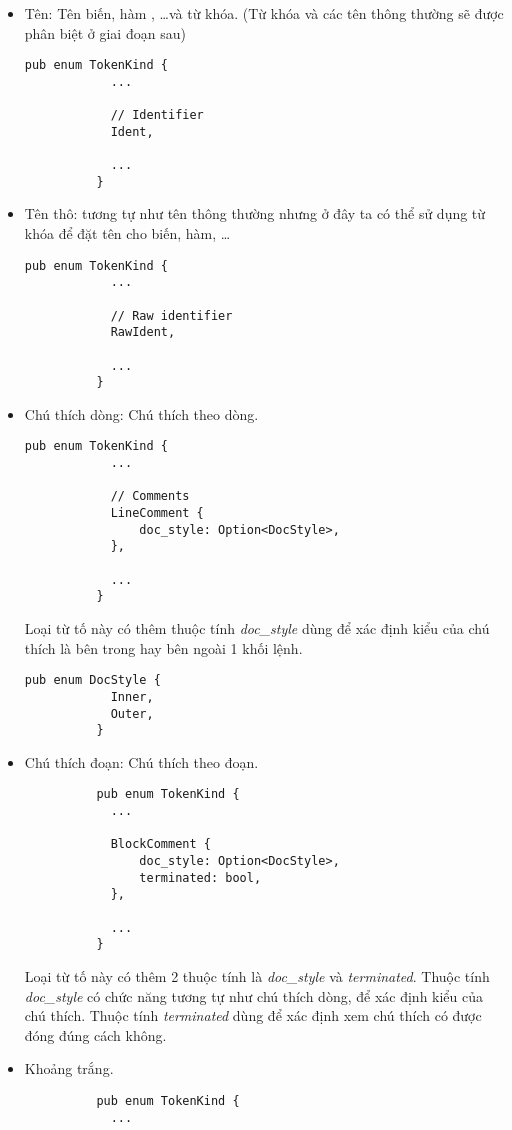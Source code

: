 \begin{itemize}
\begin{itemize}
    \end{itemize}
  \item Tên: Tên biến, hàm , \dots\space và từ khóa. (Từ khóa và các tên thông thường sẽ được phân biệt ở giai đoạn sau)
        \begin{lstlisting}[]
          pub enum TokenKind {
            ...
        
            // Identifier
            Ident,
        
            ...
          }
        \end{lstlisting}
  \item Tên thô: tương tự như tên thông thường nhưng ở đây ta có thể sử dụng từ khóa để đặt tên cho biến, hàm, \dots
        \begin{lstlisting}[]
          pub enum TokenKind {
            ...
        
            // Raw identifier
            RawIdent,
        
            ...
          }
        \end{lstlisting}
  \item Chú thích dòng: Chú thích theo dòng. 
        \begin{lstlisting}[]
          pub enum TokenKind {
            ...
        
            // Comments
            LineComment {
                doc_style: Option<DocStyle>,
            },

            ...
          }
        \end{lstlisting}
        Loại từ tố này có thêm thuộc tính \textit{doc\_style} dùng để xác định kiểu của chú thích là bên trong hay bên ngoài 1 khối lệnh.
        \begin{lstlisting}[]
          pub enum DocStyle {
            Inner,
            Outer,
          }
        \end{lstlisting}
  \item Chú thích đoạn:  Chú thích theo đoạn. 
        \begin{lstlisting}
          pub enum TokenKind {
            ...

            BlockComment {
                doc_style: Option<DocStyle>,
                terminated: bool,
            },

            ...
          }
        \end{lstlisting}
        Loại từ tố này có thêm 2 thuộc tính là \textit{doc\_style} và \textit{terminated}. Thuộc tính \textit{doc\_style} có chức năng tương tự như chú thích dòng, để xác định kiểu của chú thích. Thuộc tính \textit{terminated} dùng để xác định xem chú thích có được đóng đúng cách không.
  \item Khoảng trắng.
        \begin{lstlisting}
          pub enum TokenKind {
            ...


\end{lstlisting}
\end{itemize}
